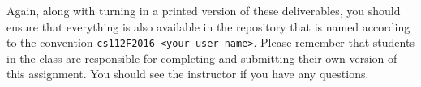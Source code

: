 Again, along with turning in a printed version of these deliverables, you should ensure that everything is also
available in the repository that is named according to the convention {\tt cs112F2016-<your user name>}. Please remember
that students in the class are responsible for completing and submitting their own version of this assignment. You
should see the instructor if you have any questions.



